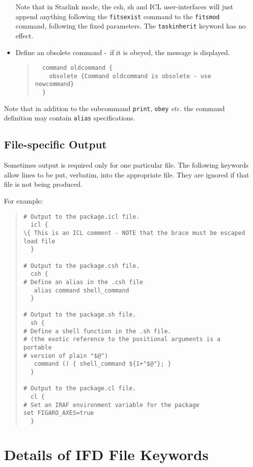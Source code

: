 \documentclass[twoside,11pt]{article}
\newcommand{\xlabel}[1]{}
\newcommand{\dash}{--}
\renewcommand{\dash}{-}
\begin{document}
\begin{itemize}
Note that in Starlink mode, the csh, sh and ICL user-interfaces will just
append anything following the \texttt{fitsexist} command to the 
\texttt{fitsmod} command, following the fixed parameters. The
\texttt{taskinherit} keyword has no effect.
\item Define an obsolete command \dash\ if it is obeyed, the message is 
displayed.
\begin{quote} \begin{verbatim}
  command oldcommand {
    obsolete {Command oldcommand is obsolete - use newcommand}
  }
\end{verbatim} \end{quote}
\end{itemize}

Note that in addition to the subcommand \texttt{print}, \texttt{obey} 
\textit{etc.} the command definition may contain \texttt{alias} 
specifications.

\subsection{\xlabel{filespecific_output}File-specific Output}
Sometimes output is required only for one particular file. The following
keywords allow lines to be put, verbatim, into the appropriate file.
They are ignored if that file is not being produced.

For example:

\begin{quote} \begin{verbatim}
# Output to the package.icl file.
  icl {
\{ This is an ICL comment - NOTE that the brace must be escaped
load file
  }

# Output to the package.csh file.
  csh {
# Define an alias in the .csh file
   alias command shell_command
  }

# Output to the package.sh file.
  sh {
# Define a shell function in the .sh file.
# (the exotic reference to the positional arguments is a portable
# version of plain "$@")
   command () { shell_command ${1+"$@"}; }
  } 

# Output to the package.cl file.
  cl {
# Set an IRAF environment variable for the package
set FIGARO_AXES=true
  }
\end{verbatim} \end{quote}

\newpage
\section{\xlabel{details_of_ifd_file_keywords}\label{keywords}Details of IFD 
File Keywords}
\end{document}
